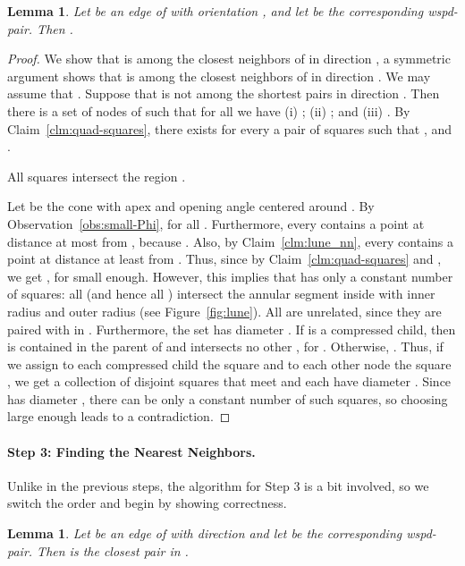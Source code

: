 \documentclass[11pt]{paper}
\newtheorem {lem}[theorem] {Lemma}
\begin{document}
\begin {lem}\label{lem:constant-neighbors}
Let  be an edge of  with orientation , and
let  be the corresponding wspd-pair.
Then .
\end {lem}

\begin {proof}
We show that  is among the  closest neighbors
of  in direction , a symmetric argument shows that 
is among the  closest neighbors of  in direction .
We may assume that  .
Suppose that  is not among the  shortest pairs
in direction .
Then there is a set  of  nodes
of  such that for all  we have
(i) ;
(ii) ; and
(iii) .
By Claim~\ref{clm:quad-squares}, there exists for every
 a pair of squares  such that
,  and
.

 {All squares  intersect the region .}


Let  be the cone with apex  and opening angle
 centered around . By Observation~\ref{obs:small-Phi},
 for all .
Furthermore, every  contains a point at distance at most  from
, because .
Also, by Claim~\ref{clm:lune_nn}, every  contains a point
at distance at least 
from . Thus, since  
by Claim~\ref {clm:quad-squares} and
, we get ,
for  small enough. However, this implies that
 has only a constant number of squares:
all  (and hence all )
intersect the annular segment   inside
 with inner radius  and outer radius
 (see Figure~\ref{fig:lune}).
All  are unrelated, since they are paired with
 in . Furthermore, the set  has diameter .
If  is a compressed child, then  is contained in the
parent of  and intersects no
other , for . Otherwise, 
. Thus, if we assign to each compressed child
 the square  and to each other node  the square
, we get a collection of  disjoint squares that
meet  and each have diameter . 
Since  has diameter , 
there can be only a constant number of such
squares, so
choosing  large enough leads to a contradiction.
\end{proof}

\paragraph{Step 3: Finding the Nearest Neighbors.}
Unlike in the previous steps, the algorithm for Step 3 is a bit
involved, so we switch the order and begin by
showing correctness.

\begin{lem}\label{lem:emst_nn}
Let  be an edge of  with direction
 and let  be the corresponding wspd-pair.
Then  is the closest pair in .
\end{lem}
\end{document}
